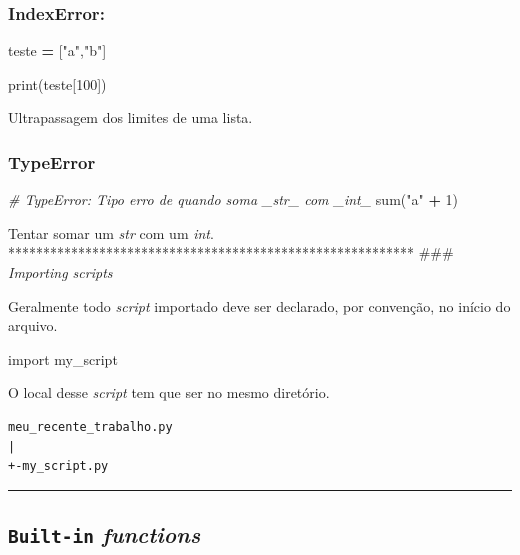 \documentclass[]{book}
\newenvironment{Shaded}{\begin{snugshade}}{\end{snugshade}}
\newcommand{\DecValTok}[1]{\textcolor[rgb]{0.00,0.00,0.81}{#1}}
\newcommand{\StringTok}[1]{\textcolor[rgb]{0.31,0.60,0.02}{#1}}
\newcommand{\ImportTok}[1]{#1}
\newcommand{\CommentTok}[1]{\textcolor[rgb]{0.56,0.35,0.01}{\textit{#1}}}
\newcommand{\OperatorTok}[1]{\textcolor[rgb]{0.81,0.36,0.00}{\textbf{#1}}}
\newcommand{\BuiltInTok}[1]{#1}
\newcommand{\NormalTok}[1]{#1}
\begin{document}
\subsubsection{IndexError:}\label{indexerror}

\begin{Shaded}
\begin{Highlighting}[]
\NormalTok{teste }\OperatorTok{=}\NormalTok{ [}\StringTok{"a"}\NormalTok{,}\StringTok{"b"}\NormalTok{]}

\BuiltInTok{print}\NormalTok{(teste[}\DecValTok{100}\NormalTok{])}
\end{Highlighting}
\end{Shaded}

Ultrapassagem dos limites de uma lista.

\subsubsection{TypeError}\label{typeerror}

\begin{Shaded}
\begin{Highlighting}[]
\CommentTok{# TypeError: Tipo erro de quando soma _str_ com _int_}
\BuiltInTok{sum}\NormalTok{(}\StringTok{"a"} \OperatorTok{+} \DecValTok{1}\NormalTok{)}
\end{Highlighting}
\end{Shaded}

Tentar somar um \emph{str} com um \emph{int}.
********************************************************** \#\#\#
\emph{Importing scripts}

Geralmente todo \emph{script} importado deve ser declarado, por
convenção, no início do arquivo.

\begin{Shaded}
\begin{Highlighting}[]
\ImportTok{import}\NormalTok{ my_script}
\end{Highlighting}
\end{Shaded}

O local desse \emph{script} tem que ser no mesmo diretório.

\begin{verbatim}
meu_recente_trabalho.py
|
+-my_script.py
\end{verbatim}

\begin{center}\rule{0.5\linewidth}{\linethickness}\end{center}

\subsection{\texorpdfstring{\texttt{Built-in}
\emph{functions}}{Built-in functions}}\label{built-in-functions-3}
\end{document}
